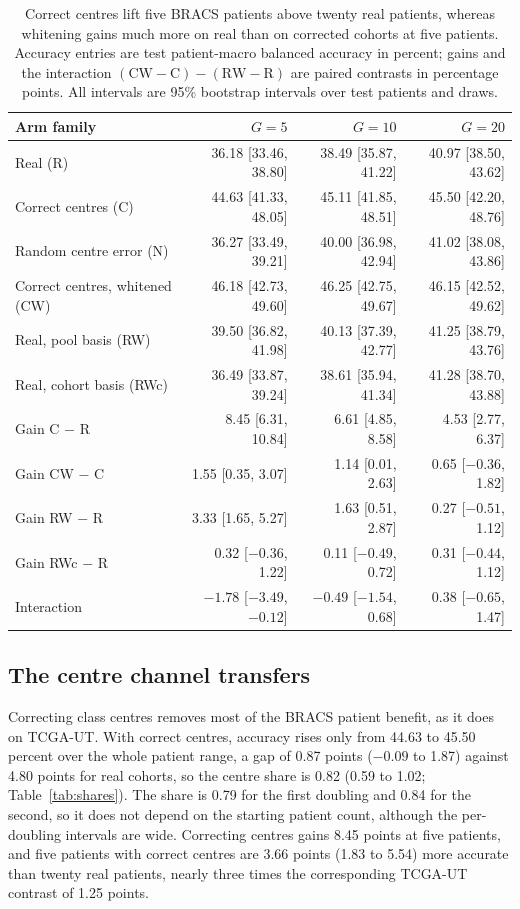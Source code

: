 \documentclass[11pt]{article}
\begin{document}
\begin{table}[htbp]
\centering
\small
\renewcommand{\arraystretch}{1.15}
\begin{tabular}{@{}lrrr@{}}
\toprule
Arm family & $G=5$ & $G=10$ & $G=20$ \\
\midrule
Real (R) & 36.18 [33.46, 38.80] & 38.49 [35.87, 41.22] & 40.97 [38.50, 43.62] \\
Correct centres (C) & 44.63 [41.33, 48.05] & 45.11 [41.85, 48.51] & 45.50 [42.20, 48.76] \\
Random centre error (N) & 36.27 [33.49, 39.21] & 40.00 [36.98, 42.94] & 41.02 [38.08, 43.86] \\
Correct centres, whitened (CW) & 46.18 [42.73, 49.60] & 46.25 [42.75, 49.67] & 46.15 [42.52, 49.62] \\
Real, pool basis (RW) & 39.50 [36.82, 41.98] & 40.13 [37.39, 42.77] & 41.25 [38.79, 43.76] \\
Real, cohort basis (RWc) & 36.49 [33.87, 39.24] & 38.61 [35.94, 41.34] & 41.28 [38.70, 43.88] \\
\addlinespace
Gain C $-$ R & 8.45 [6.31, 10.84] & 6.61 [4.85, 8.58] & 4.53 [2.77, 6.37] \\
Gain CW $-$ C & 1.55 [0.35, 3.07] & 1.14 [0.01, 2.63] & 0.65 [$-0.36$, 1.82] \\
Gain RW $-$ R & 3.33 [1.65, 5.27] & 1.63 [0.51, 2.87] & 0.27 [$-0.51$, 1.12] \\
Gain RWc $-$ R & 0.32 [$-0.36$, 1.22] & 0.11 [$-0.49$, 0.72] & 0.31 [$-0.44$, 1.12] \\
Interaction & $-1.78$ [$-3.49$, $-0.12$] & $-0.49$ [$-1.54$, 0.68] & 0.38 [$-0.65$, 1.47] \\
\bottomrule
\end{tabular}
\caption{Correct centres lift five BRACS patients above twenty real patients, whereas whitening gains much more on real than on corrected cohorts at five patients. Accuracy entries are test patient-macro balanced accuracy in percent; gains and the interaction $(\mathrm{CW}-\mathrm C)-(\mathrm{RW}-\mathrm R)$ are paired contrasts in percentage points. All intervals are 95\% bootstrap intervals over test patients and draws.}
\label{tab:accuracy}
\end{table}

\subsection{The centre channel transfers}
\label{sec:centre-results}
Correcting class centres removes most of the BRACS patient benefit, as it does on TCGA-UT. With correct centres, accuracy rises only from 44.63 to 45.50 percent over the whole patient range, a gap of 0.87 points ($-0.09$ to 1.87) against 4.80 points for real cohorts, so the centre share is 0.82 (0.59 to 1.02; Table~\ref{tab:shares}). The share is 0.79 for the first doubling and 0.84 for the second, so it does not depend on the starting patient count, although the per-doubling intervals are wide. Correcting centres gains 8.45 points at five patients, and five patients with correct centres are 3.66 points (1.83 to 5.54) more accurate than twenty real patients, nearly three times the corresponding TCGA-UT contrast of 1.25 points.
\end{document}
